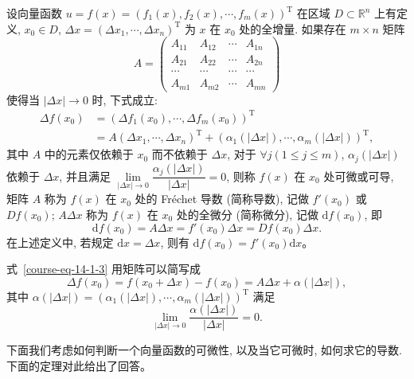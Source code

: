 \documentclass[12pt,fontset=fandol]{ctexart}
\begin{document}
\begin{definition}\label{course-definition-14-1-5}\quad 设向量函数 $u=f(x)=(f_1(x),f_2(x),\cdots,f_m(x))^\mathrm T$ 在区域 $D\subset\mathbb R^n$ 上有定义, $x_0\in D$, $\Delta x=(\Delta x_1,\cdots,\Delta x_n)^\mathrm T$ 为 $x$ 在 $x_0$ 处的全增量. 如果存在 $m\times n$ 矩阵
\[
  A=
  \begin{pmatrix}
    A_{11}&A_{12}&\cdots&A_{1n}\\
    A_{21}&A_{22}&\cdots&A_{2n}\\
    \cdots&\cdots&\cdots&\cdots\\
    A_{m1}&A_{m2}&\cdots&A_{mn}
  \end{pmatrix}
\]
使得当 $|\Delta x|\to0$ 时, 下式成立:
\begin{equation}
\begin{aligned}
  \Delta f(x_0)
  &=(\Delta f_1(x_0),\cdots,\Delta f_m(x_0))^\mathrm T\\
  &=A(\Delta x_1,\cdots,\Delta x_n)^\mathrm T
  +(\alpha_1(|\Delta x|),\cdots,\alpha_m(|\Delta x|))^\mathrm T,
\end{aligned}
\label{course-eq-14-1-3}
\end{equation}
其中 $A$ 中的元素仅依赖于 $x_0$ 而不依赖于 $\Delta x$, 对于 $\forall j(1\leqslant j\leqslant m)$, $\alpha_j(|\Delta x|)$ 依赖于 $\Delta x$, 并且满足 $\lim\limits_{|\Delta x|\to0}\dfrac{\alpha_j(|\Delta x|)}{|\Delta x|}=0$, 则称 $f(x)$ 在 $x_0$ 处可微或可导, 矩阵 $A$ 称为 $f(x)$ 在 $x_0$ 处的 Fréchet 导数 (简称导数), 记做 $f'(x_0)$ 或 $Df(x_0)$; $A\Delta x$ 称为 $f(x)$ 在 $x_0$ 处的全微分 (简称微分), 记做 $\mathrm df(x_0)$, 即
\[
  \mathrm df(x_0)=A\Delta x=f'(x_0)\Delta x=Df(x_0)\Delta x.
\]
在上述定义中, 若规定 $\mathrm dx=\Delta x$, 则有 $\mathrm df(x_0)=f'(x_0)\mathrm dx$。

式~\eqref{course-eq-14-1-3}  用矩阵可以简写成
\[
  \Delta f(x_0)=f(x_0+\Delta x)-f(x_0)=A\Delta x+\alpha(|\Delta x|),
\]
其中 $\alpha(|\Delta x|)=(\alpha_1(|\Delta x|),\cdots,\alpha_m(|\Delta x|))^\mathrm T$ 满足
\[
  \lim_{|\Delta x|\to0}\frac{\alpha(|\Delta x|)}{|\Delta x|}=0.
\]

下面我们考虑如何判断一个向量函数的可微性, 以及当它可微时, 如何求它的导数. 下面的定理对此给出了回答。

\end{definition}
\end{document}
